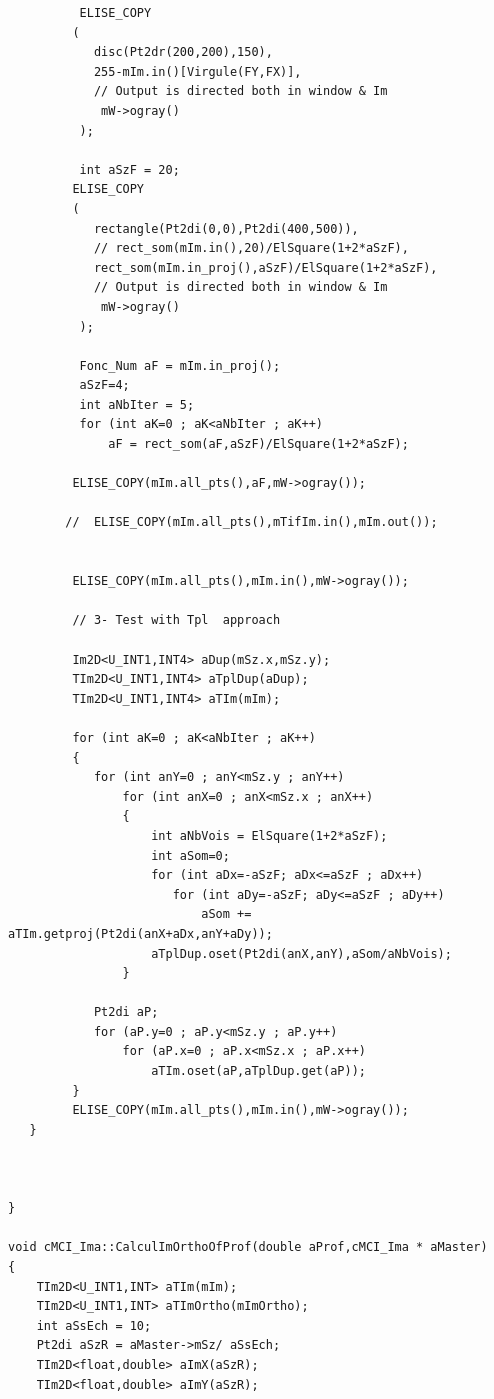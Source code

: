 \begin{verbatim}
          ELISE_COPY
         (
            disc(Pt2dr(200,200),150),
            255-mIm.in()[Virgule(FY,FX)],
            // Output is directed both in window & Im
             mW->ogray()
          );

          int aSzF = 20;
         ELISE_COPY
         (
            rectangle(Pt2di(0,0),Pt2di(400,500)),
            // rect_som(mIm.in(),20)/ElSquare(1+2*aSzF),
            rect_som(mIm.in_proj(),aSzF)/ElSquare(1+2*aSzF),
            // Output is directed both in window & Im
             mW->ogray()
          );

          Fonc_Num aF = mIm.in_proj();
          aSzF=4;
          int aNbIter = 5;
          for (int aK=0 ; aK<aNbIter ; aK++)
              aF = rect_som(aF,aSzF)/ElSquare(1+2*aSzF);

         ELISE_COPY(mIm.all_pts(),aF,mW->ogray());

        //  ELISE_COPY(mIm.all_pts(),mTifIm.in(),mIm.out());


         ELISE_COPY(mIm.all_pts(),mIm.in(),mW->ogray());

         // 3- Test with Tpl  approach

         Im2D<U_INT1,INT4> aDup(mSz.x,mSz.y);
         TIm2D<U_INT1,INT4> aTplDup(aDup);
         TIm2D<U_INT1,INT4> aTIm(mIm);

         for (int aK=0 ; aK<aNbIter ; aK++)
         {
            for (int anY=0 ; anY<mSz.y ; anY++)
                for (int anX=0 ; anX<mSz.x ; anX++)
                {
                    int aNbVois = ElSquare(1+2*aSzF);
                    int aSom=0;
                    for (int aDx=-aSzF; aDx<=aSzF ; aDx++)
                       for (int aDy=-aSzF; aDy<=aSzF ; aDy++)
                           aSom += aTIm.getproj(Pt2di(anX+aDx,anY+aDy));
                    aTplDup.oset(Pt2di(anX,anY),aSom/aNbVois);
                }

            Pt2di aP;
            for (aP.y=0 ; aP.y<mSz.y ; aP.y++)
                for (aP.x=0 ; aP.x<mSz.x ; aP.x++)
                    aTIm.oset(aP,aTplDup.get(aP));
         }
         ELISE_COPY(mIm.all_pts(),mIm.in(),mW->ogray());
   }



}

void cMCI_Ima::CalculImOrthoOfProf(double aProf,cMCI_Ima * aMaster)
{
    TIm2D<U_INT1,INT> aTIm(mIm);
    TIm2D<U_INT1,INT> aTImOrtho(mImOrtho);
    int aSsEch = 10;
    Pt2di aSzR = aMaster->mSz/ aSsEch;
    TIm2D<float,double> aImX(aSzR);
    TIm2D<float,double> aImY(aSzR);


\end{verbatim}
